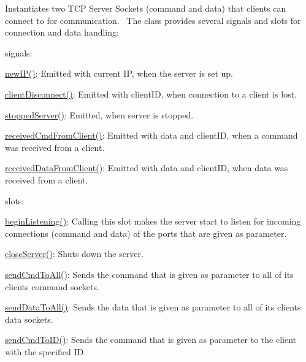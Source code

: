 Instantiates two T\+C\+P Server Sockets (command and data) that clients can connect to for communication.~\newline
 The class provides several signals and slots for connection and data handling\+: 
\begin{DoxyItemize}
\item signals\+: 
\begin{DoxyItemize}
\item \hyperlink{class_network_1_1_server_socket_a454aaa0c29dcf8558061145ca200c3aa}{new\+I\+P()}\+: Emitted with current I\+P, when the server is set up. 
\item \hyperlink{class_network_1_1_server_socket_a8788c49c9d78b0e36d04c4accee2f9c3}{client\+Disconnect()}\+: Emitted with client\+I\+D, when connection to a client is lost. 
\item \hyperlink{class_network_1_1_server_socket_a65f1a073129152a95d54b8507620289b}{stopped\+Server()}\+: Emitted, when server is stopped. 
\item \hyperlink{class_network_1_1_server_socket_ae1d282d143e7036b55e5e7ae983c29b7}{received\+Cmd\+From\+Client()}\+: Emitted with data and client\+I\+D, when a command was received from a client. 
\item \hyperlink{class_network_1_1_server_socket_a17b0484dc24fc45db95126b3244586d8}{received\+Data\+From\+Client()}\+: Emitted with data and client\+I\+D, when data was received from a client. 
\end{DoxyItemize}
\item slots\+: 
\begin{DoxyItemize}
\item \hyperlink{class_network_1_1_server_socket_a9e41efd6e4e10a04f89ee75968516ffa}{begin\+Listening()}\+: Calling this slot makes the server start to listen for incoming connections (command and data) of the ports that are given as parameter. 
\item \hyperlink{class_network_1_1_server_socket_a7a2145ba09e19b47acc31e1c52e3d302}{close\+Server()}\+: Shuts down the server. 
\item \hyperlink{class_network_1_1_server_socket_a9a308f099e84a216bfcb4c4bf4a49882}{send\+Cmd\+To\+All()}\+: Sends the command that is given as parameter to all of its clients command sockets. 
\item \hyperlink{class_network_1_1_server_socket_a0d912607084ea9bc15626f3d88e5ac79}{send\+Data\+To\+All()}\+: Sends the data that is given as parameter to all of its clients data sockets. 
\item \hyperlink{class_network_1_1_server_socket_ac222f49a8b6ed8b55e1592d954bfb7d9}{send\+Cmd\+To\+I\+D()}\+: Sends the command that is given as parameter to the client with the specified I\+D. 

\end{DoxyItemize}
\end{DoxyItemize}
